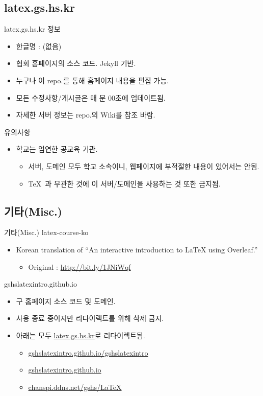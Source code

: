 \documentclass[12pt]{beamer}
\begin{document}
\subsection{latex.gs.hs.kr}
\begin{frame}{latex.gs.hs.kr}
	정보
	\begin{itemize}
		\item 한글명 : (없음)
		\item 협회 홈페이지의 소스 코드. Jekyll 기반.
		\item 누구나 이 repo.를 통해 홈페이지 내용을 편집 가능.
		\item 모든 수정사항/게시글은 매 분 00초에 업데이트됨.
		\item 자세한 서버 정보는 repo.의 Wiki를 참조 바람.
	\end{itemize}
	\vfill
	유의사항
	\begin{itemize}
		\item 학교는 엄연한 공교육 기관.
		\begin{itemize}
			\item 서버, 도메인 모두 학교 소속이니, 웹페이지에 부적절한 내용이 있어서는 안됨.
			\item \TeX\ 과 무관한 것에 이 서버/도메인을 사용하는 것 또한 금지됨.
		\end{itemize}
	\end{itemize}
	\vfill
\end{frame}
\subsection{기타(Misc.)}
\begin{frame}{기타(Misc.)}
	latex-course-ko
	\begin{itemize}
		\item Korean translation of ``An interactive introduction to LaTeX using Overleaf.''
		\begin{itemize}
			\item Original : \url{http://bit.ly/1JNiWqf}
		\end{itemize}
	\end{itemize}
	\vfill
	gshslatexintro.github.io
	\begin{itemize}
		\item 구 홈페이지 소스 코드 및 도메인.
		\item 사용 종료 중이지만 리다이렉트를 위해 삭제 금지.
		\item 아래는 모두 \url{latex.gs.hs.kr}로 리다이렉트됨.
		\begin{itemize}
			\item \url{gshslatexintro.github.io/gshslatexintro}
			\item \url{gshslatexintro.github.io}
			\item \url{chanspi.ddns.net/gshs/LaTeX}
		\end{itemize}
	\end{itemize}
	\vfill
\end{frame}
\end{document}

